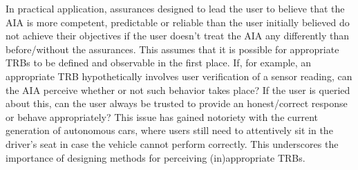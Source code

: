 In practical application, assurances designed to lead the user to believe that the AIA is more competent, predictable or reliable than the user initially believed do not achieve their objectives if the user doesn't treat the AIA any differently than before/without the assurances. 
This assumes that it is possible for appropriate TRBs to be defined and observable in the first place. 
If, for example, an appropriate TRB hypothetically involves user verification of a sensor reading, can the AIA perceive whether or not such behavior takes place? 
If the user is queried about this, can the user always be trusted to provide an honest/correct response or behave appropriately? 
This issue has gained notoriety with the current generation of autonomous cars, where users still need to attentively sit in the driver's seat in case the vehicle cannot perform correctly. This underscores the importance of designing methods for perceiving (in)appropriate TRBs. 
%
%
%
